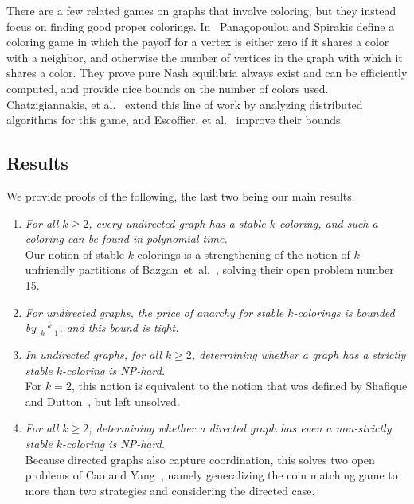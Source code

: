 \documentclass{llncs}
\begin{document}
There are a few related games on graphs that involve coloring, but they instead
focus on finding good proper colorings. In~\cite{PS08} Panagopoulou and
Spirakis define a coloring game in which the payoff for a vertex is either zero
if it shares a color with a neighbor, and otherwise the number of vertices in
the graph with which it shares a color. They prove pure Nash equilibria always
exist and can be efficiently computed, and provide nice bounds
on the number of colors used. Chatzigiannakis, et al.~\cite{CKPS10} extend this line of work
by analyzing distributed algorithms for this game, and
Escoffier, et al.~\cite{EGM12} improve their bounds. 



\subsection{Results}

We provide proofs of the following, the last two being our main results.

\begin{enumerate}

\item \emph{For all $k \ge 2$, every undirected graph has a stable
$k$-coloring, and such a coloring can be found in polynomial time.}  \\ Our
notion of stable $k$-colorings is a strengthening of the notion of
$k$-unfriendly partitions of Bazgan~et~al.~\cite{BazganTV10}, solving their
open problem number 15.

\item \emph{For undirected graphs, the price of anarchy for stable $k$-colorings is
bounded by $\frac{k}{k-1}$, and this bound is tight.}

\item \emph{In undirected graphs, for all $k \ge 2$, determining whether a
graph has a strictly stable $k$-coloring is NP-hard.}  \\ For $k=2$, this
notion is equivalent to the notion that was defined by Shafique and
Dutton~\cite{ShafiqueD09}, but left unsolved.

\item \emph{For all $k \ge 2$, determining whether a directed graph has even a
non-strictly stable $k$-coloring is NP-hard.}\\  Because directed graphs also
capture coordination, this solves two open problems of Cao and
Yang~\cite{CaoY12a}, namely generalizing the coin matching game to more than
two strategies and considering the directed case. 

\end{enumerate}
\end{document}
